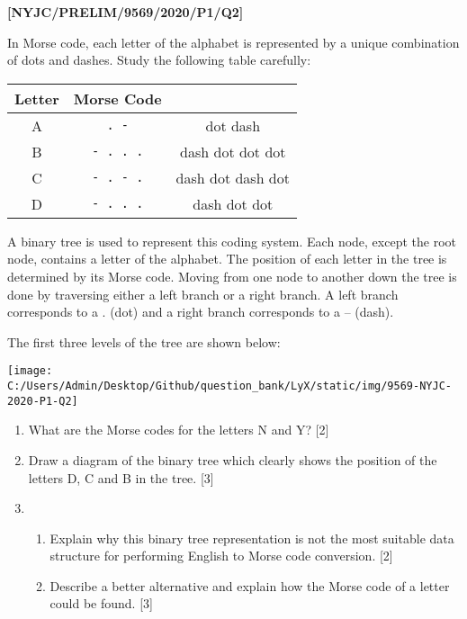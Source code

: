 \item \textbf{{[}NYJC/PRELIM/9569/2020/P1/Q2{]} }

In Morse code, each letter of the alphabet is represented by a unique
combination of dots and dashes. Study the following table carefully:
\noindent \begin{center}
\begin{tabular}{|c|c|c|}
\hline 
\textbf{Letter} & \textbf{Morse Code} & \tabularnewline
\hline 
\hline 
A & \texttt{. -} & dot dash\tabularnewline
\hline 
B & \texttt{- . . .} & dash dot dot dot\tabularnewline
\hline 
C & \texttt{- . - .} & dash dot dash dot\tabularnewline
\hline 
D & \texttt{- . . .} & dash dot dot\tabularnewline
\hline 
\end{tabular}
\par\end{center}

A binary tree is used to represent this coding system. Each node,
except the root node, contains a letter of the alphabet. The position
of each letter in the tree is determined by its Morse code. Moving
from one node to another down the tree is done by traversing either
a left branch or a right branch. A left branch corresponds to a .
(dot) and a right branch corresponds to a -- (dash). 

The first three levels of the tree are shown below:
\begin{center}
\texttt{[image: C:/Users/Admin/Desktop/Github/question\_bank/LyX/static/img/9569-NYJC-2020-P1-Q2]}
\par\end{center}
\begin{enumerate}
\item What are the Morse codes for the letters N and Y? \hfill{}{[}2{]}
\item Draw a diagram of the binary tree which clearly shows the position
of the letters D, C and B in the tree.\hfill{} {[}3{]}
\item {}
\begin{enumerate}
\item Explain why this binary tree representation is not the most suitable
data structure for performing English to Morse code conversion. \hfill{}{[}2{]}
\item Describe a better alternative and explain how the Morse code of a
letter could be found. \hfill{}{[}3{]}
\end{enumerate}
\end{enumerate}